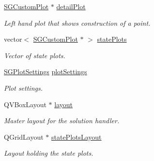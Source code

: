 \begin{DoxyCompactItemize}
\mbox{\label{classSGSolutionHandler_a58a074e937c0806aea01159d3afc0234}} 
\hyperlink{classSGCustomPlot}{S\+G\+Custom\+Plot} $\ast$ \hyperlink{classSGSolutionHandler_a58a074e937c0806aea01159d3afc0234}{detail\+Plot}
\begin{DoxyCompactList}\small\item\em Left hand plot that shows construction of a point. \end{DoxyCompactList}\item 
vector$<$ \hyperlink{classSGCustomPlot}{S\+G\+Custom\+Plot} $\ast$ $>$ \hyperlink{classSGSolutionHandler_acdd63bfa69bbffd3dadc4bec4b1b7948}{state\+Plots}
\begin{DoxyCompactList}\small\item\em Vector of state plots. \end{DoxyCompactList}\item 
\mbox{\label{classSGSolutionHandler_ac56eec3a339cc52a4792d338113dd469}} 
\hyperlink{classSGPlotSettings}{S\+G\+Plot\+Settings} \hyperlink{classSGSolutionHandler_ac56eec3a339cc52a4792d338113dd469}{plot\+Settings}
\begin{DoxyCompactList}\small\item\em Plot settings. \end{DoxyCompactList}\item 
\mbox{\label{classSGSolutionHandler_a98537ae234250e1c6d6b285a47bcb494}} 
Q\+V\+Box\+Layout $\ast$ \hyperlink{classSGSolutionHandler_a98537ae234250e1c6d6b285a47bcb494}{layout}
\begin{DoxyCompactList}\small\item\em Master layout for the solution handler. \end{DoxyCompactList}\item 
\mbox{\label{classSGSolutionHandler_a92d6a7c150dc74f15813300e8a3e3505}} 
Q\+Grid\+Layout $\ast$ \hyperlink{classSGSolutionHandler_a92d6a7c150dc74f15813300e8a3e3505}{state\+Plots\+Layout}
\begin{DoxyCompactList}\small\item\em Layout holding the state plots. \end{DoxyCompactList}\item 
\mbox{\label{classSGSolutionHandler_a96449b0e5785c0de1ce9797df2f3dab1}} 

\end{DoxyCompactItemize}
